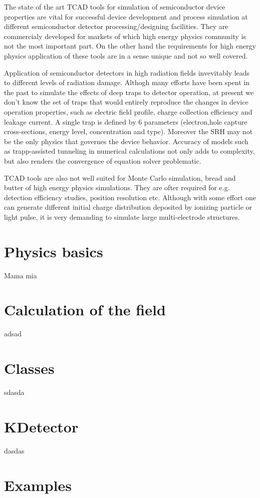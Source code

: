 \documentclass{book}
\begin{document}
The state of the art TCAD tools for simulation of semiconductor device properties 
are vital for successful device development and process simulation at different 
semiconductor detector processing/designing facilities. They are commercialy developed
for markets of which high energy physics community is not the most important part. On the other 
hand the requirements for high energy physics application of these tools are in a sense 
unique and not so well covered. 

Application of semiconductor detectors in high radiation 
fields invevitably leads to different levels of radiation damage. Althogh many efforts have
been spent in the past to simulate the effects of deep traps to detector operation, 
at present we don't know the set of traps that would entirely reproduce the changes in 
device operation properties, such as electric field profile, charge collection efficiency and leakage 
current. A single trap is defined by 6 parameters (electron,hole capture cross-sections, 
energy level, concentration and type). Moreover the SRH may not be the only physics that governes the
device behavior. Accuracy of models such as trapp-assisted tunneling in numerical calculations 
not only adds to complexity, but also renders the convergence of equation solver problematic.

TCAD tools are also not well suited for Monte Carlo simulation, bread and butter of 
high energy physics simulations. They are ofter required for e.g. detection efficiency studies, 
position resolution etc. Although with some effort one can generate different initial 
charge distribution deposited by ionizing particle or light pulse, it is very demanding to simulate 
large multi-electrode structures.
 

\chapter{Physics basics}
Mama mia

\chapter{Calculation of the field}
adsad
\chapter{Classes}
sdasda
\chapter{KDetector}
dasdas
\chapter{Examples}

\newpage
\renewcommand{\cftchapdotsep}{\cftdotsep}
\tableofcontents
\end{document}
